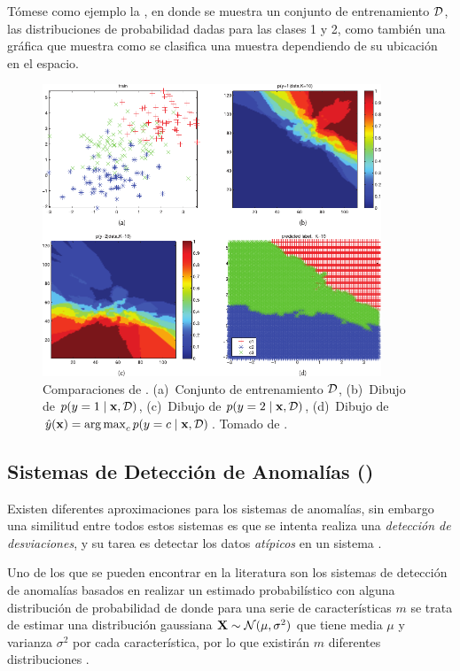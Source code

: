 Tómese como ejemplo la , en donde se muestra un conjunto de entrenamiento $\mathcal{D}$, las distribuciones de probabilidad dadas para las clases 1 y 2, como también una gráfica que muestra como se clasifica una muestra dependiendo de su ubicación en el espacio.

\begin{figure}[H]
   \centering
   \includegraphics[width=0.9\textwidth]{Figures/knn-comparisons.pdf}
   \decoRule
   \caption[Comparaciones de \textsl{}]{Comparaciones de \textsl{}. (a)~Conjunto de entrenamiento $\mathcal{D}$, (b)~Dibujo de $p(y=1 \mid {\mathbf{x}}, \mathcal{D})$, (c)~Dibujo de $p(y=2 \mid {\mathbf{x}}, \mathcal{D})$, (d)~Dibujo de $\hat{y}({\mathbf{x}}) = \operatorname*{arg\,max}_{c} p(y=c \mid {\mathbf{x}}, \mathcal{D})$. Tomado de \cite{murphymachinel}.}
   \label{fig:knn-comparisons}
\end{figure}


\subsection{Sistemas de Detección de Anomalías ()}
Existen diferentes aproximaciones para los sistemas de anomalías, sin embargo una similitud entre todos estos sistemas es que se intenta realiza una \emph{detección de desviaciones}, y su tarea es detectar los datos \emph{atípicos} en un sistema \cite{tan2005introduction}.

Uno de los que se pueden encontrar en la literatura son los sistemas de detección de anomalías basados en realizar un estimado probabilístico con alguna distribución de probabilidad de donde para una serie de características $m$ se trata de estimar una distribución gaussiana ${\mathbf{X}} \sim \mathcal{N}(\mu, \sigma^2)$ que tiene media $\mu$ y varianza $\sigma^2$ por cada característica, por lo que existirán $m$ diferentes distribuciones .


